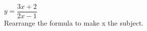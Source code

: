\question $y=\dfrac{3 x+2}{2 x-1}$ \\ 
Rearrange the formula to make x the subject.\\
\vspace{140pt}
{}